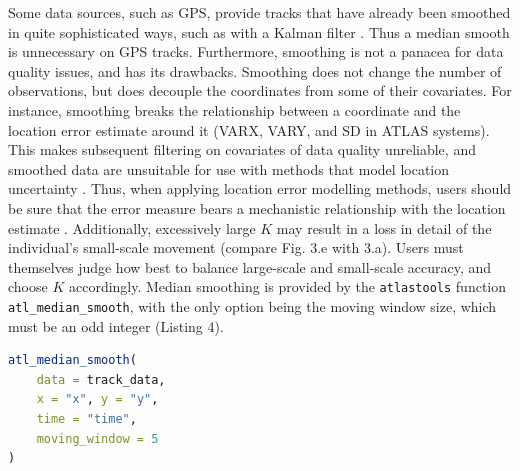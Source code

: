 \documentclass[10pt,paper=a4,headings=standardclasses
]{scrartcl}
\begin{document}
Some data sources, such as GPS, provide tracks that have already been smoothed in quite sophisticated ways, such as with a Kalman filter \citep{kaplan2005}.
Thus a median smooth is unnecessary on GPS tracks.
Furthermore, smoothing is not a panacea for data quality issues, and has its drawbacks.
Smoothing does not change the number of observations, but does decouple the coordinates from some of their covariates.
For instance, smoothing breaks the relationship between a coordinate and the location error estimate around it (VARX, VARY, and SD in ATLAS systems).
This makes subsequent filtering on covariates of data quality unreliable, and smoothed data are unsuitable for use with methods that model location uncertainty \citep{noonan2019, fleming2014a, fleming2020, calabrese2016}.
Thus, when applying location error modelling methods, users should be sure that the error measure bears a mechanistic relationship with the location estimate \citep[see][ for more details]{fleming2020, noonan2019}.
Additionally, excessively large $K$ may result in a loss in detail of the individual's small-scale movement (compare Fig. 3.e with 3.a).
Users must themselves judge how best to balance large-scale and small-scale accuracy, and choose $K$ accordingly.
Median smoothing is provided by the \texttt{atlastools} function \texttt{atl\_median\_smooth}, with the only option being the moving window size, which must be an odd integer (Listing 4).

\begin{lstlisting}[float, language=R, style=customR, caption = {
    Median smoothing a movement track using the function \texttt{atl\_median\_smooth} function with a moving window \textit{K = 5}. 
    Larger values of $K$ yield smoother tracks, but $K$ should always be some orders of magnitude lower than the number of observations.}]
atl_median_smooth(
    data = track_data,
    x = "x", y = "y",
    time = "time",
    moving_window = 5
)
\end{lstlisting}
\end{document}
